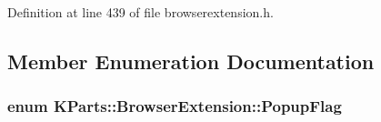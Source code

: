 \-Definition at line 439 of file browserextension.\-h.



\subsection{\-Member \-Enumeration \-Documentation}
\hypertarget{classKParts_1_1BrowserExtension_ae5b9acf92e7d83faf5142597371ef1e3}{
\subsubsection[{\-Popup\-Flag}]{\setlength{\rightskip}{0pt plus 5cm}enum {\bf \-K\-Parts\-::\-Browser\-Extension\-::\-Popup\-Flag}}}\label{classKParts_1_1BrowserExtension_ae5b9acf92e7d83faf5142597371ef1e3}
